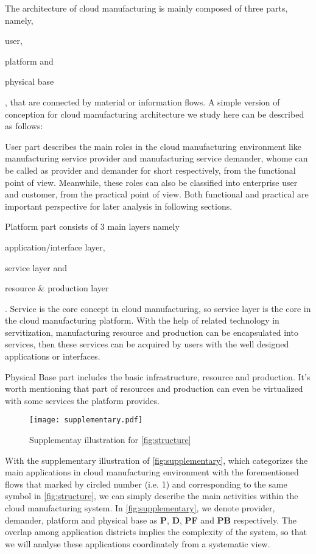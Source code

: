 The architecture of cloud manufacturing is mainly composed of three parts, namely, \begin{inparaenum}[1)]
\item user,
\item platform and
\item physical base
\end{inparaenum}, that are connected by material or information flows. A simple version of conception for cloud manufacturing architecture we study here can be described as follows:
\begin{compactdesc}
\item [User] part describes the main roles in the cloud manufacturing environment like manufacturing service provider and manufacturing service demander, whome can be called as provider and demander for short respectively, from the functional point of view. Meanwhile, these roles can also be classified into enterprise user and customer, from the practical point of view. Both functional and practical are important perspective for later analysis in following sections. 
\item [Platform] part consists of 3 main layers namely
	\begin{inparaenum}[1)]
	\item application/interface layer,
	\item service layer and 
	\item resource \& production layer
	\end{inparaenum}.
Service is the core concept in cloud manufacturing, so service layer is the core in the cloud manufacturing platform. With the help of related technology in servitization, manufacturing resource and production can be encapsulated into services, then these services can be acquired by users with the well designed applications or interfaces.
\item [Physical Base] part includes the basic infrastructure, resource and production. It's worth mentioning that part of resources and production can even be virtualized with some services the platform provides.
\end{compactdesc}
 
\begin{figure}[htbp]
\centering
\texttt{[image: supplementary.pdf]}
\caption{Supplementay illustration for \autoref{fig:structure}}
\label{fig:supplementary}
\end{figure}

With the supplementary illustration of \autoref{fig:supplementary}, which categorizes the main applications in cloud manufacturing environment with the forementioned flows that marked by circled number (i.e. \textcircled{\small{1}}) and corresponding to the same symbol in \autoref{fig:structure}, we can simply describe the main activities within the cloud manufacturing system. In \autoref{fig:supplementary}, we denote provider, demander, platform and physical base as \textbf{P}, \textbf{D}, \textbf{PF} and \textbf{PB} respectively. The overlap among application districts implies the complexity of the system, so that we will analyse these applications coordinately from a systematic view.

